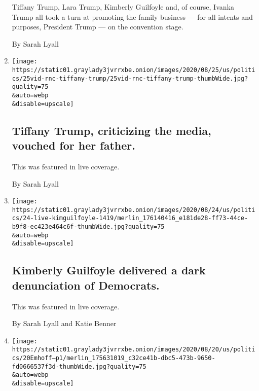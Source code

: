 \begin{enumerate}
  Tiffany Trump, Lara Trump, Kimberly Guilfoyle and, of course, Ivanka
  Trump all took a turn at promoting the family business --- for all
  intents and purposes, President Trump --- on the convention stage.

  By Sarah Lyall
\item
  \href{/live/2020/08/25/us/rnc-convention-election/tiffany-trump-criticizing-the-media-vouched-for-her-father}{}

  \texttt{[image: https://static01.graylady3jvrrxbe.onion/images/2020/08/25/us/politics/25vid-rnc-tiffany-trump/25vid-rnc-tiffany-trump-thumbWide.jpg?quality=75\\\&auto=webp\\\&disable=upscale]}

  \hypertarget{tiffany-trump-criticizing-the-media-vouched-for-her-father}{%
  \subsection{Tiffany Trump, criticizing the media, vouched for her
  father.}\label{tiffany-trump-criticizing-the-media-vouched-for-her-father}}

  This was featured in live coverage.

  By Sarah Lyall
\item
  \href{/live/2020/08/24/us/rnc-convention-election/kimberly-guilfoyle-delivered-a-dark-denunciation-of-democrats}{}

  \texttt{[image: https://static01.graylady3jvrrxbe.onion/images/2020/08/24/us/politics/24-live-kimguilfoyle-1419/merlin\_176140416\_e181de28-ff73-44ce-b9f8-ec423e464c6f-thumbWide.jpg?quality=75\\\&auto=webp\\\&disable=upscale]}

  \hypertarget{kimberly-guilfoyle-delivered-a-dark-denunciation-of-democrats}{%
  \subsection{Kimberly Guilfoyle delivered a dark denunciation of
  Democrats.}\label{kimberly-guilfoyle-delivered-a-dark-denunciation-of-democrats}}

  This was featured in live coverage.

  By Sarah Lyall and Katie Benner
\item
  \href{/2020/08/19/us/elections/doug-emhoff-is-a-contender-to-become-the-countrys-first-second-gentleman.html}{}

  \texttt{[image: https://static01.graylady3jvrrxbe.onion/images/2020/08/20/us/politics/20Emhoff--p1/merlin\_175631019\_c32ce41b-dbc5-473b-9650-fd0666537f3d-thumbWide.jpg?quality=75\\\&auto=webp\\\&disable=upscale]}


\end{enumerate}
